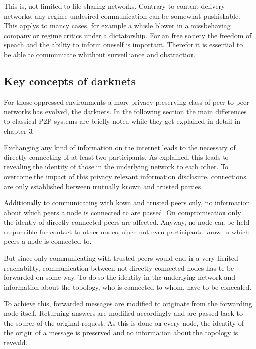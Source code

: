 This is, not limited to file sharing networks. Contrary to content delivery networks, any regime undesired communication can be somewhat pushishable. This applys to mancy cases, for example a whisle blower in a missbehaving company or regime critics under a dictatorship. For an free society the freedom of speach and the ability to inform oneself is important. Therefor it is essential to be able to communicate whithout surveilliance and obstraction.



\subsection{Key concepts of darknets}

For those oppressed environments a more privacy preserving class of peer-to-peer networks has evolved, the darknets. In the following section the main differences to classical P2P systems are briefly noted while they get explained in detail in chapter 3.

Exchanging any kind of information on the internet leads to the necessaty of directly connecting of at least two participants. As explained, this leads to revealing the identity of those in the underlying network to each other. To overcome the impact of this privacy relevant information disclosure, connections are only established between mutually known and trusted parties.

Additionally to communicating with kown and trusted peers only, no information about which peers a node is connected to are passed. On compromisation only the identiy of directly connected peers are affected. Anyway, no node can be held responsible for contact to other nodes, since not even participants know to which peers a node is connected to.

But since only communicating with trusted peers would end in a very limited reachability, communication between not directly connected nodes has to be forwarded on some way. To do so the identity in the underlying network and information about the topology, who is connected to whom, have to be concealed.

To achieve this, forwarded messages are modified to originate from the forwarding node itself. Returning answers are modified accordingly and are passed back to the source of the original request.  As this is done on every node, the identity of the origin of a message is preserved and no information about the topology is reveald.




